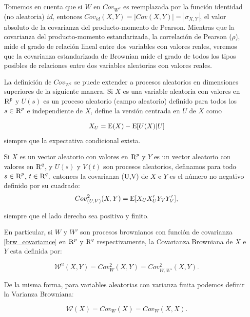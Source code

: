		Tomemos en cuenta que si ${W}$ en ${Cov}_{{W}^2}$ es reemplazada por la funci\'on identidad (no aleatoria) $id$, entonces ${Cov}_{id}(X, Y) = |{Cov}(X, Y)| = |\sigma_{X,Y}|$, el valor absoluto de la covarianza del producto-momento de Pearson. Mientras que la covarianza del producto-momento estandarizada, la correlación de Pearson ($\rho$), mide el grado de relaci\'on lineal entre dos variables con valores reales, veremos que la covarianza estandarizada de Brownian mide el grado de todos los tipos posibles de relaciones entre dos variables aleatorias con valores reales.

		La definición de ${Cov}_{{W}^2}$ se puede extender a procesos aleatorios en dimensiones superiores de la siguiente manera. Si $X$ es una variable aleatoria con valores en $\textsc{R}^p$ y $U(s)$ es un proceso aleatorio (campo aleatorio) definido para todos los $s \in \textsc{R}^p$ e independiente de $X$, define la versión centrada en $U$ de $X$ como

		$$
			X_U=\operatorname{E}(X)-\operatorname{E}[U(X)|U]
		$$
		siempre que la expectativa condicional exista.

		\begin{defn}
			Si $X$ es un vector aleatorio con valores en $\textsc{R}^p$ y $Y$ es un vector aleatorio con valores en $\textsc{R}^q$, y $U(s)$ y $V(t)$ son procesos aleatorios, definamos para todo $s\in\textsc{R}^p$, $t\in\textsc{R}^q$, entonces la covarianza (U,V) de $X$ e $Y$ es el n\'umero no negativo definido por su cuadrado:
			\begin{equation}\label{eq_35_brcov}
				{Cov}^2_{(U,V)}(X,Y) = \operatorname{E}[X_U X'_U Y_V Y'_V],
			\end{equation}
				
			siempre que el lado derecho sea positivo y finito.
		\end{defn}

		En particular, si ${W}$ y ${W'}$ son procesos brownianos con funci\'on de covarianza \ref{brw_covariamce} en $\textsc{R}^p$ y $\textsc{R}^q$ respectivamente, la Covarianza Browniana de $X$ e $Y$ esta definida por:

		\begin{equation}
			\mathcal{W}^2(X,Y) = Cov^2_W(X,Y) = Cov^2_{W,W'}(X,Y).
		\end{equation}

		De la misma forma, para variables aleatorias con varianza finita podemos definir la Varianza Browniana:

		\begin{equation}
			\mathcal{W}(X) = Cov_W(X) = Cov_{W}(X,X).
		\end{equation}
		
